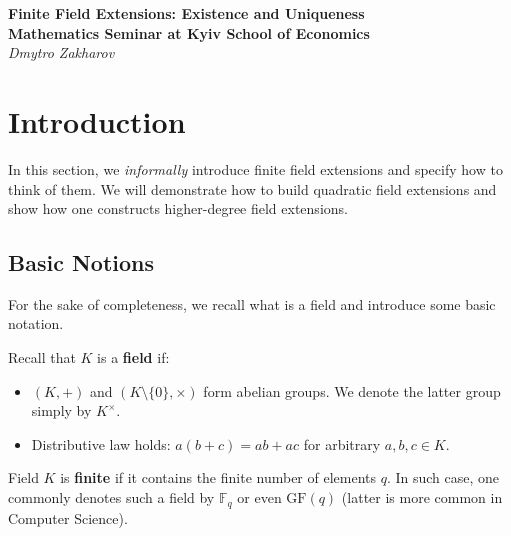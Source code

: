 \documentclass{template}
\begin{document}
\begin{center}
    \Large \textcolor{blue!70!black}{\textbf{Finite Field Extensions: Existence and Uniqueness}} \\
    \large \textbf{Mathematics Seminar at Kyiv School of Economics} \\
    \normalsize \textit{Dmytro Zakharov}
\end{center}

\begin{abstract}
    This small lecture is devoted to a quick glance at the structure of finite
    fields, primarly based on~\cite[Chapter 7]{ireland1990classical}. One
    obvious well-known example of the finite field is $\mathbb{Z}/p\mathbb{Z}$,
    but is this the only possible finite field? We first show the explicit
    construction of the finite field of order $p^n$ for prime $p$ and build the
    intuition of how elements of such fields look like. We then show that
    \textit{(i)} $p^n$ is the only possible such a finite field order,
    \textit{(ii)} always possible regardless of the chosen characteristic $p$,
    and \textit{(iii)} such construction is unique (up to an isomorphism).
\end{abstract}

\tableofcontents

\newpage

\section{Introduction}

In this section, we \textit{informally} introduce finite field extensions and
specify how to think of them. We will demonstrate how to build quadratic field
extensions and show how one constructs higher-degree field extensions.

\subsection{Basic Notions}

For the sake of completeness, we recall what is a field and introduce some basic
notation.

\begin{definition}
    Recall that $K$ is a \textbf{field} if:
    \begin{itemize}
        \item $(K,+)$ and $(K\setminus\{0\},\times)$ form
        abelian groups. We denote the latter group simply by
        $K^{\times}$.
        \item Distributive law holds: $a(b+c)=ab+ac$ for arbitrary $a,b,c \in K$.
    \end{itemize}
    Field $K$ is \textbf{finite} if it contains the finite number of elements
    $q$. In such case, one commonly denotes such a field by $\mathbb{F}_q$ or
    even $\text{GF}(q)$ (latter is more common in Computer Science).
\end{definition}
\end{document}
